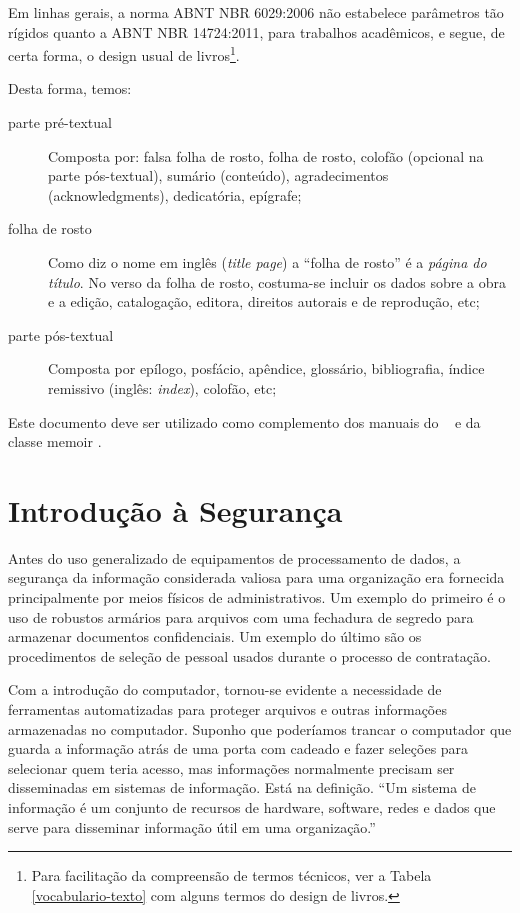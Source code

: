\documentclass[
	10pt,				%
	openright,			%
	twoside,			%
	a5paper,			%
	english,			%
	french,				%
	spanish,			%
	brazil,				%
	sumario=tradicional
]{abntex2}
\begin{document}
Em linhas gerais, a norma ABNT NBR 6029:2006 não estabelece parâmetros tão
rígidos quanto a ABNT NBR 14724:2011, para trabalhos acadêmicos, e segue, de
certa forma, o design usual de livros\footnote{Para facilitação da compreensão
de termos técnicos, ver a Tabela \ref{vocabulario-texto} com alguns termos do
design de livros.}.

Desta forma, temos:

\begin{description}
\item[parte pré-textual] Composta por: falsa folha de rosto, folha de rosto,
colofão (opcional na parte pós-textual), sumário (conteúdo),
a\-gra\-de\-ci\-men\-tos (acknowledgments), dedicatória, epígrafe;
\item[folha de rosto] Como diz o nome em inglês (\textit{title page}) a ``folha
de rosto'' é a \textit{página do título}. No verso da folha de rosto, costuma-se
incluir os dados sobre a obra e a edição, catalogação, editora, direitos
autorais e de reprodução, etc;
\item [parte pós-textual] Composta por epílogo, posfácio, apêndice, glossário,
bibliografia, índice remissivo (inglês: \textit{index}), colofão, etc;

\end{description}

Este documento deve ser utilizado como complemento dos manuais do \abnTeX\ 
\cite{abntex2classe,abntex2cite,abntex2cite-alf} e da classe \textsf{memoir}
\cite{memoir}. 

  
\chapter{Introdução à Segurança}

Antes do uso generalizado de equipamentos de processamento de dados, a segurança da informação considerada valiosa para uma organização era fornecida principalmente por meios físicos de administrativos. Um exemplo do primeiro é o uso de robustos armários para arquivos com uma fechadura de segredo para armazenar documentos confidenciais. Um exemplo do último são os procedimentos de seleção de pessoal usados durante o processo de contratação.

Com a introdução do computador, tornou-se evidente a necessidade de ferramentas automatizadas para proteger arquivos e outras informações armazenadas no computador. Suponho que poderíamos trancar o computador que guarda a informação atrás de uma porta com cadeado e fazer seleções para selecionar quem teria acesso, mas informações normalmente precisam ser disseminadas em sistemas de informação. Está na definição. “Um sistema de informação é um conjunto de recursos de hardware, software, redes e dados que serve para disseminar informação útil em uma organização.”
\end{document}
